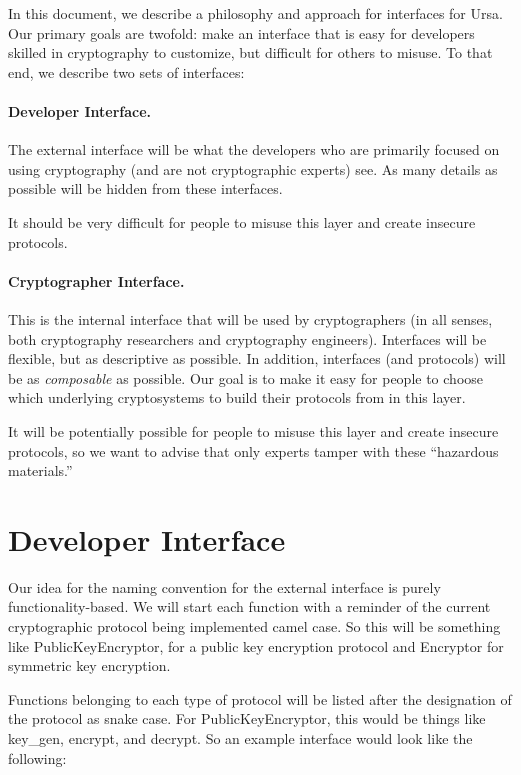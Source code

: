 

In this document, we describe a philosophy and approach for interfaces for Ursa.  Our primary goals are twofold:  make an interface that is easy for developers skilled in cryptography to customize, but difficult for others to misuse.  To that end, we describe two sets of interfaces:

\paragraph{Developer Interface.}  The external interface will be what the developers who are primarily focused on using cryptography (and are not cryptographic experts) see.  As many details as possible will be hidden from these interfaces.

It should be very difficult for people to misuse this layer and create insecure protocols.

\paragraph{Cryptographer Interface.}  This is the internal interface that will be used by cryptographers (in all senses, both cryptography researchers and cryptography engineers).  Interfaces will be flexible, but as descriptive as possible.  In addition, interfaces (and protocols) will be as \emph{composable} as possible.  Our goal is to make it easy for people to choose which underlying cryptosystems to build their protocols from in this layer.

It will be potentially possible for people to misuse this layer and create insecure protocols, so we want to advise that only experts tamper with these ``hazardous materials.''

\section{Developer Interface}
Our idea for the naming convention for the external interface is purely functionality-based.  We will start each function with a reminder of the current cryptographic protocol being implemented camel case.  So this will be something like PublicKeyEncryptor, for a public key encryption protocol and Encryptor for symmetric key encryption.

Functions belonging to each type of protocol will be listed after the designation of the protocol as snake case.  For PublicKeyEncryptor, this would be things like key\_gen, encrypt, and decrypt.  So an example interface would look like the following:

